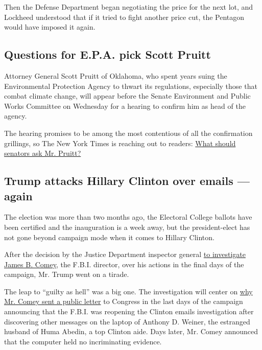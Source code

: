Then the Defense Department began negotiating the price for the next
lot, and Lockheed understood that if it tried to fight another price
cut, the Pentagon would have imposed it again.

\hypertarget{questions-for-epa-pick-scott-pruitt}{%
\subsection{Questions for E.P.A. pick Scott
Pruitt}\label{questions-for-epa-pick-scott-pruitt}}

Attorney General Scott Pruitt of Oklahoma, who spent years suing the
Environmental Protection Agency to thwart its regulations, especially
those that combat climate change, will appear before the Senate
Environment and Public Works Committee on Wednesday for a hearing to
confirm him as head of the agency.

The hearing promises to be among the most contentious of all the
confirmation grillings, so The New York Times is reaching out to
readers:
\href{http://www.nytimes.com/interactive/2017/01/13/science/epa-scott-pruitt-questions.html}{What
should senators ask Mr. Pruitt?}

\hypertarget{trump-attacks-hillary-clinton-over-emails--again}{%
\subsection{Trump attacks Hillary Clinton over emails ---
again}\label{trump-attacks-hillary-clinton-over-emails--again}}

The election was more than two months ago, the Electoral College ballots
have been certified and the inauguration is a week away, but the
president-elect has not gone beyond campaign mode when it comes to
Hillary Clinton.

After the decision by the Justice Department inspector general
\href{https://www.nytimes.com/2017/01/12/us/politics/james-comey-fbi-inspector-general-hillary-clinton.html}{to
investigate James B. Comey}, the F.B.I. director, over his actions in
the final days of the campaign, Mr. Trump went on a tirade.

The leap to ``guilty as hell'' was a big one. The investigation will
center on
\href{https://www.nytimes.com/2017/01/12/us/politics/james-comey-fbi-inspector-general-hillary-clinton.html}{why
Mr. Comey sent a public letter} to Congress in the last days of the
campaign announcing that the F.B.I. was reopening the Clinton emails
investigation after discovering other messages on the laptop of Anthony
D. Weiner, the estranged husband of Huma Abedin, a top Clinton aide.
Days later, Mr. Comey announced that the computer held no incriminating
evidence.

